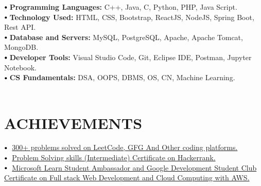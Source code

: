 \documentclass[letterpaper,11pt]{article}
\newcommand\sbullet[1][.5]{\mathbin{\vcenter{\hbox{\scalebox{#1}{$\bullet$}}}}}
\begin{document}
    \small{\item{
     $\sbullet[.75] \hspace{0.1cm}$\textbf{\normalsize{Programming Languages:}}{ \normalsize{C++, Java, C, Python, PHP, Java Script.}} \\
     \vspace{8pt}
    $\sbullet[.75] \hspace{0.1cm}$\textbf{\normalsize{Technology Used:}}{ \normalsize{HTML, CSS, Bootstrap, ReactJS, NodeJS, Spring Boot, Rest API.}}\\
    \vspace{8pt}
    $\sbullet[.75] \hspace{0.1cm}$\textbf{\normalsize{Database and Servers:}}{ \normalsize{MySQL, PostgreSQL, Apache, Apache Tomcat, MongoDB.}}\\
    \vspace{8pt}
     $\sbullet[.75] \hspace{0.1cm}$\textbf{\normalsize{Developer Tools:}}{ \normalsize{Visual Studio Code, Git, Eclipse IDE, Postman, Jupyter Notebook.}} \\
     \vspace{8pt}
     $\sbullet[.75] \hspace{0.1cm}$\textbf{\normalsize{CS Fundamentals:}}{ \normalsize{DSA, OOPS, DBMS, OS, CN, Machine Learning.}} \\
   \\
    }}

\section{ACHIEVEMENTS}

\small\item
$\sbullet[.75] \hspace{0.1cm}$ {\href{https://leetcode.com/Akash01/}{ 300+ problems solved on LeetCode, GFG And Other coding platforms.}} \hspace{1cm}\\
\vspace{5pt}
$\sbullet[.75] \hspace{0.1cm}$ {\href{https://www.hackerrank.com/certificates/275c7c102a1b}{ Problem Solving skills (Intermediate) Certificate on Hackerrank.}} \hspace{1.6cm}\\
\vspace{5pt}
$\sbullet[.75] \hspace{0.1cm}$ {\href{https://github.com/Akash-Chowdhury/MY-CERTIFICATES/blob/main/devtown%20web%20development.pdf}{ Microsoft Learn Student Ambassador and Google Development Student Club Certificate on Full stack Web Development      
and Cloud Computing with AWS.}}\\
\vspace{}
\end{document}
